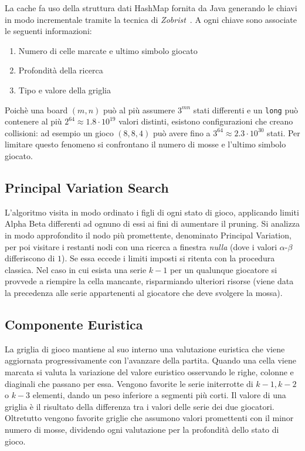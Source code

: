\documentclass{article}
\begin{document}
La cache fa uso della struttura dati HashMap fornita da Java generando le chiavi 
in modo incrementale tramite la tecnica di \emph{Zobrist}~\cite{zobrist}. A ogni
chiave sono associate le seguenti informazioni:
\begin{enumerate}
  \item Numero di celle marcate e ultimo simbolo giocato
  \item Profondit\`a della ricerca
  \item Tipo e valore della griglia
\end{enumerate}
Poich\`e una board $(m,n)$ pu\`o al pi\`u assumere $3^{mn}$ stati differenti e
un \verb!long! pu\`o contenere al pi\`u $2^{64} \approx 1.8 \cdot 10^{19}$ valori distinti,
esistono configurazioni che creano collisioni: ad esempio un gioco $(8, 8, 4)$
pu\`o avere fino a $3^{64} \approx 2.3 \cdot 10^{30}$ stati. Per limitare questo
fenomeno si confrontano il numero di mosse e l'ultimo simbolo giocato.

\subsection*{Principal Variation Search}

L'algoritmo visita in modo ordinato i figli di ogni stato di gioco, applicando
limiti Alpha Beta differenti ad ognuno di essi ai fini di aumentare il pruning.
Si analizza in modo approfondito il nodo pi\`u promettente, denominato Principal
Variation, per poi visitare i restanti nodi con una ricerca a finestra \emph{nulla}
(dove i valori $\alpha$-$\beta$ differiscono di $1$). Se essa eccede i limiti
imposti si ritenta con la procedura classica.
Nel caso in cui esista una serie $k-1$ per un qualunque giocatore si provvede a
riempire la cella mancante, risparmiando ulteriori risorse (viene data la precedenza
alle serie appartenenti al giocatore che deve svolgere la mossa).

\subsection*{Componente Euristica}

La griglia di gioco mantiene al suo interno una valutazione euristica che viene
aggiornata progressivamente con l'avanzare della partita. Quando una cella viene
marcata si valuta la variazione del valore euristico osservando le righe,
colonne e diaginali che passano per essa. Vengono favorite le serie initerrotte
di $k-1, k-2$ o $k-3$ elementi, dando un peso inferiore a segmenti pi\`u corti.
Il valore di una griglia \`e il risultato della differenza tra i valori delle serie
dei due giocatori. Oltretutto vengono favorite griglie che assumono valori promettenti
con il minor numero di mosse, dividendo ogni valutazione per la profondit\`a
dello stato di gioco.



\end{document}
